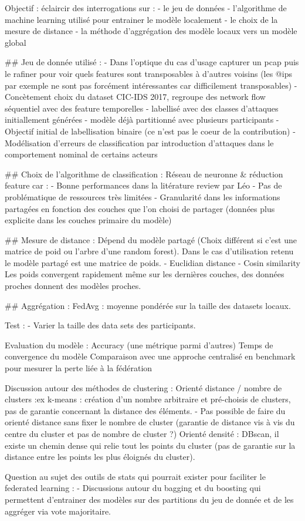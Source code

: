 
Objectif : 
éclaircir des interrogations sur : 
- le jeu de données
- l'algorithme de machine learning utilisé pour entrainer le modèle localement 
- le choix de la mesure de distance
- la méthode d'aggrégation des modèle locaux vers un modèle global


## Jeu de donnée utilisé : 
- Dans l'optique du cas d'usage capturer un pcap puis le rafiner pour voir quels features sont transposables à d'autres voisins (les @ips par exemple ne sont pas forcément intéressantes car difficilement transposables)
- Concètement choix du dataset CIC-IDS 2017, regroupe des network flow séquentiel avec des feature temporelles
	- labellisé avec des classes d'attaques initiallement générées
	- modèle déjà partitionné avec plusieurs participants
- Objectif initial de labellisation binaire (ce n'est pas le coeur de la contribution)
- Modélisation d'erreurs de classification par introduction d'attaques dans le comportement nominal de certains acteurs

## Choix de l'algorithme de classification : 
Réseau de neuronne & réduction feature car : 
- Bonne performances dans la litérature review par Léo
- Pas de problématique de ressources très limitées
- Granularité dans les informations partagées en fonction des couches que l'on choisi de partager (données plus explicite dans les couches primaire du modèle) 

## Mesure de distance :
Dépend du modèle partagé (Choix différent si c'est une matrice de poid ou l'arbre d'une random forest). Dans le cas d'utilisation retenu le modèle partagé est une matrice de poids. 
- Euclidian distance 
- Cosin similarity 
Les poids convergent rapidement même sur les dernières couches, des données proches donnent des modèles proches. 

## Aggrégation : 
FedAvg : moyenne pondérée sur la taille des datasets locaux.

Test : 
- Varier la taille des data sets des participants. 

Evaluation du modèle : 
Accuracy (une métrique parmi d'autres)
Temps de convergence du modèle
Comparaison avec une approche centralisé en benchmark pour mesurer la perte liée à la fédération


Discussion autour des méthodes de clustering : 
Orienté distance / nombre de clusters :ex k-means : création d'un nombre arbitraire et pré-choisis de clusters, pas de garantie concernant la distance des éléments. 
	- Pas possible de faire du orienté distance sans fixer le nombre de cluster (garantie de distance vis à vis du centre du cluster et pas de nombre de cluster ?)
Orienté densité : DBscan, il existe un chemin dense qui relie tout les points du cluster (pas de garantie sur la distance entre les points les plus éloignés du cluster).  

Question au sujet des outils de stats qui pourrait exister pour faciliter le federated learning : 
- Discussions autour du bagging et du boosting qui permettent d'entrainer des modèles sur des partitions du jeu de donnée et de les aggréger via vote majoritaire. 
